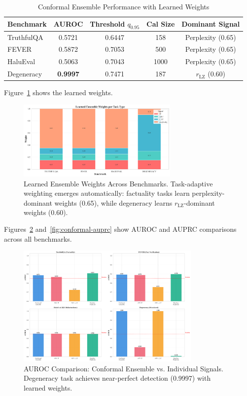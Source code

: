 \documentclass[11pt]{article}
\begin{document}
\begin{table}[h]
\centering
\caption{Conformal Ensemble Performance with Learned Weights}
\label{tab:conformal-results}
\begin{tabular}{lcccc}
\toprule
\textbf{Benchmark} & \textbf{AUROC} & \textbf{Threshold} $q_{0.95}$ & \textbf{Cal Size} & \textbf{Dominant Signal} \\
\midrule
TruthfulQA  & 0.5721 & 0.6447 & 158  & Perplexity (0.65) \\
FEVER       & 0.5872 & 0.7053 & 500  & Perplexity (0.65) \\
HaluEval    & 0.5063 & 0.7043 & 1000 & Perplexity (0.65) \\
Degeneracy  & \textbf{0.9997} & 0.7471 & 187  & $r_{\text{LZ}}$ (0.60) \\
\bottomrule
\end{tabular}
\end{table}

Figure~\ref{fig:conformal-weights} shows the learned weights.

\begin{figure}[h]
\centering
\includegraphics[width=0.7\textwidth]{figures/ensemble_weights_comparison.png}
\caption{Learned Ensemble Weights Across Benchmarks. Task-adaptive weighting emerges automatically: factuality tasks learn perplexity-dominant weights (0.65), while degeneracy learns $r_{\text{LZ}}$-dominant weights (0.60).}
\label{fig:conformal-weights}
\end{figure}

Figures~\ref{fig:conformal-auroc} and~\ref{fig:conformal-auprc} show AUROC and AUPRC comparisons across all benchmarks.

\begin{figure}[h]
\centering
\includegraphics[width=0.8\textwidth]{figures/auroc_comparison_conformal.png}
\caption{AUROC Comparison: Conformal Ensemble vs. Individual Signals. Degeneracy task achieves near-perfect detection (0.9997) with learned weights.}
\label{fig:conformal-auroc}
\end{figure}
\end{document}
